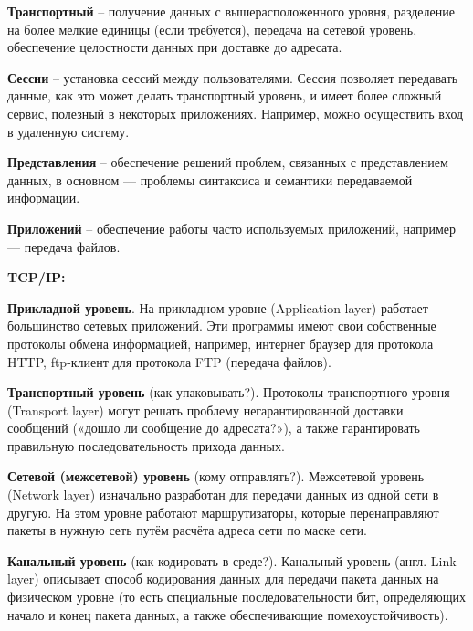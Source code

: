 \textbf{Транспортный} -- получение данных с вышерасположенного уровня, разделение на более мелкие единицы (если требуется), передача на сетевой уровень, обеспечение целостности данных при доставке до адресата.

\textbf{Сессии} -- установка сессий между пользователями. Сессия позволяет передавать данные, как это может делать транспортный уровень, и имеет более сложный сервис, полезный в некоторых приложениях. Например, можно осуществить вход в удаленную систему.

\textbf{Представления} -- обеспечение решений проблем, связанных с представлением данных, в основном — проблемы синтаксиса и семантики передаваемой информации.

\textbf{Приложений} -- обеспечение работы часто используемых приложений, например — передача файлов.



\bigbreak
\textbf{TCP/IP:}

\textbf{Прикладной уровень}.
На прикладном уровне (Application layer) работает большинство сетевых приложений.
Эти программы имеют свои собственные протоколы обмена информацией, например, интернет браузер для протокола HTTP, ftp-клиент для протокола FTP (передача файлов).

\textbf{Транспортный уровень} (как упаковывать?).
Протоколы транспортного уровня (Transport layer) могут решать проблему негарантированной доставки сообщений («дошло ли сообщение до адресата?»), а также гарантировать правильную последовательность прихода данных.

\textbf{Сетевой (межсетевой) уровень} (кому отправлять?).
Межсетевой уровень (Network layer) изначально разработан для передачи данных из одной сети в другую. На этом уровне работают маршрутизаторы, которые перенаправляют пакеты в нужную сеть путём расчёта адреса сети по маске сети.

\textbf{Канальный уровень} (как кодировать в среде?).
Канальный уровень (англ. Link layer) описывает способ кодирования данных для передачи пакета данных на физическом уровне (то есть специальные последовательности бит, определяющих начало и конец пакета данных, а также обеспечивающие помехоустойчивость).



